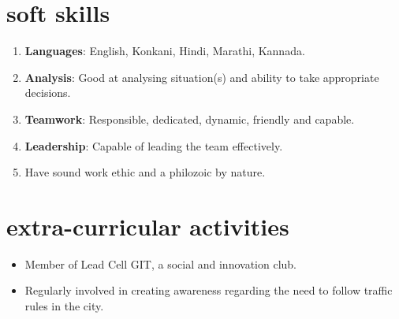 \documentclass[10pt]{article}
\begin{document}
\section*{soft skills}
\begin{enumerate}
\item \textbf{Languages}: English, Konkani, Hindi, Marathi, Kannada.
\item \textbf{Analysis}: Good at analysing situation(s) and ability to take appropriate decisions.
\item\textbf{Teamwork}: Responsible, dedicated, dynamic, friendly and capable.
\item\textbf{Leadership}: Capable of leading the team effectively. 
\item Have sound work ethic and a philozoic by nature.
\end{enumerate}
\section*{extra-curricular activities}
\begin{itemize}
\item Member of Lead Cell GIT, a social and innovation club.
\item Regularly involved in creating awareness regarding the need to follow traffic rules in the city.
\end{itemize}
\end{document}
